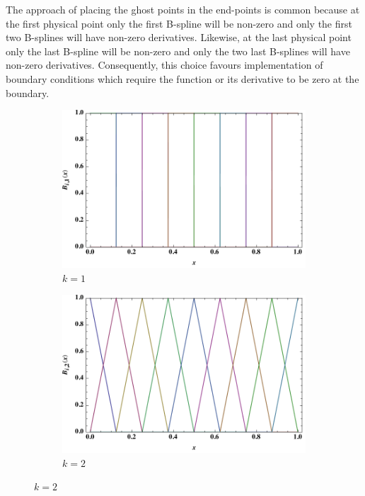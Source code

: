 The approach of placing the ghost points in the end-points is common because at the first physical point only the first B-spline will be non-zero and only the first two B-splines will have non-zero derivatives. Likewise, at the last physical point only the last B-spline will be non-zero and only the two last B-splines will have non-zero derivatives. Consequently, this choice favours implementation of boundary conditions which require the function or its derivative to be zero at the boundary.

\begin{figure}[htbp!]
	\centering
	\begin{adjustwidth}{-1cm}{-1cm}
	\begin{subfigure}{0.6\textwidth}
	\centering
	\includegraphics[width=\linewidth]{Bsp1.pdf}
	\caption{$k=1$}
\end{subfigure}%
\begin{subfigure}{0.6\textwidth}
	\centering
	\includegraphics[width=\linewidth]{Bsp2.pdf}
	\caption{$k=2$}
\end{subfigure}%


\end{adjustwidth}
\end{figure}
